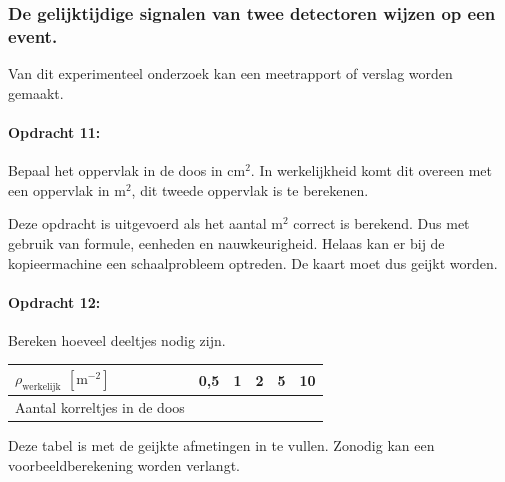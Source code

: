 \subsubsection{De gelijktijdige signalen van twee detectoren wijzen op een event.}

Van dit experimenteel onderzoek kan een meetrapport of verslag worden
gemaakt.

\bigskip{}


\begin{minipage}[t]{1\columnwidth}%

\paragraph{Opdracht 11:}

Bepaal het oppervlak in de doos in $\mathrm{cm^{2}}$. In
werkelijkheid komt dit overeen met een oppervlak in $\mathrm{m^{2}}$,
dit tweede oppervlak is te berekenen.

\bigskip{}

Deze opdracht is uitgevoerd als het aantal $\mathrm{m^{2}}$ correct
is berekend. Dus met gebruik van formule, eenheden en nauwkeurigheid.
Helaas kan er bij de kopieermachine een schaalprobleem optreden. De
kaart moet dus geijkt worden.%
\end{minipage}

\bigskip{}


\begin{minipage}[t]{1\columnwidth}%

\paragraph{Opdracht 12:}

Bereken hoeveel deeltjes nodig zijn.

\smallskip{}

\begin{tabular}{|x{.3\textwidth}|x{.1\textwidth}|x{.1\textwidth}
                |x{.1\textwidth}|x{.1\textwidth}|x{.1\textwidth}|}
    \hline 
    $\rho_\textrm{werkelijk}$ $\left[\mathrm{m^{-2}}\right]$ & 0,5 & 1 & 2 & 5 & 10 \\
    \hline 
    Aantal korreltjes in de doos &  &  &  &  & \\
    \hline 
\end{tabular}

\smallskip{}

Deze tabel is met de geijkte afmetingen in te vullen. Zonodig kan
een voorbeeldberekening worden verlangt.%
\end{minipage}


